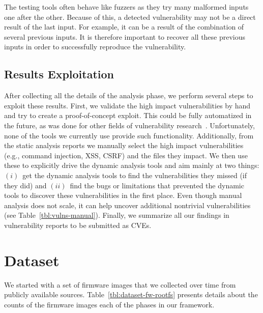 \documentclass[conference]{./templates/ndss/IEEEtran}
\newcounter{t0d0_counter}
\newcounter{pr00f_counter}
\begin{document}
The testing tools often behave like fuzzers as they try many malformed 
inputs one after the other. Because of this, a detected vulnerability
may not be a direct result of the last input. For example, it can be a
result of the combination of several previous inputs.  It is therefore
important to recover all these previous inputs in order to successfully reproduce
the vulnerability. 


\subsection{Results Exploitation}
\label{sec:results-exploitation}

After collecting all the details of the analysis phase, we perform several
steps to exploit these results.  
First, we validate the high impact vulnerabilities by hand and try to create a
proof-of-concept exploit. This could be fully automatized in the future, as
was done for other fields of vulnerability research~\cite{avgerinos2011aeg}. 
Unfortunately, none of the tools we currently use provide such functionality. 
Additionally, from the static analysis reports we manually select the high 
impact vulnerabilities (e.g., command injection, XSS, CSRF) 
and the files they impact.  We then use these to explicitly drive the dynamic analysis tools and
aim mainly at two things: $(i)$~get the dynamic analysis tools to find
the vulnerabilities they missed (if they did) and $(ii)$~find the
bugs or limitations that prevented the dynamic tools to discover these vulnerabilities in the
first place. 
Even though manual analysis does not scale, it can help uncover additional nontrivial vulnerabilities (see
Table~\ref{tbl:vulns-manual}).
Finally, we summarize all our findings in vulnerability reports to be
submitted as CVEs. 



\section{Dataset}
\label{sec:dataset}



We started with a set of firmware images that we collected over time 
from publicly available sources. 
Table~\ref{tbl:dataset-fw-rootfs} presents details about the counts of 
the firmware images each of the phases in our framework. 
\end{document}
